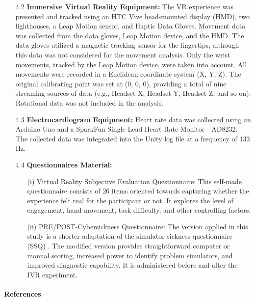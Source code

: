 \documentclass[12pt,oneside,openright]{report}
\begin{document}
\begin{enumerate}
    \item[4.2] \textbf{Immersive Virtual Reality Equipment:} The VR experience was presented and tracked using an HTC Vive head-mounted display (HMD), two lighthouses, a Leap Motion sensor, and Haptic Data Gloves. Movement data was collected from the data gloves, Leap Motion device, and the HMD. The data gloves utilized a magnetic tracking sensor for the fingertips, although this data was not considered for the movement analysis. Only the wrist movements, tracked by the Leap Motion device, were taken into account. All movements were recorded in a Euclidean coordinate system (X, Y, Z). The original calibrating point was set at (0, 0, 0), providing a total of nine streaming sources of data (e.g., Headset X, Headset Y, Headset Z, and so on). Rotational data was not included in the analysis.
    \item[4.3] \textbf{Electrocardiogram Equipment:} Heart rate data was collected using an Arduino Uno and a SparkFun Single Lead Heart Rate Monitor - AD8232. The collected data was integrated into the Unity log file at a frequency of 133 Hz.

\item[4.4] \textbf{Questionnaires Material:}
  \begin{enumerate}
    \item[(i)] Virtual Reality Subjective Evaluation Questionnaire: This self-made questionnaire consists of 26 items oriented towards capturing whether the experience felt real for the participant or not. It explores the level of engagement, hand movement, task difficulty, and other controlling factors. 
    \item[(ii)] PRE/POST-Cybersickness Questionnaire: The version applied in this study is a shorter adaptation of the simulator sickness questionnaire (SSQ) \cite{SSQ93}. The modified version provides straightforward computer or manual scoring, increased power to identify problem simulators, and improved diagnostic capability. It is administered before and after the IVR experiment.
\end{enumerate}
  \end{enumerate}


\pagebreak
\paragraph{\textbf{References}}
\printbibliography[heading=none]
\end{document}
